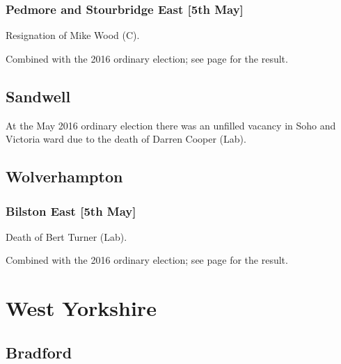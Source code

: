 \documentclass[a4paper,openany]{book}
\begin{document}
\begin{resultsiii}
\subsubsection*{Pedmore and Stourbridge East \hspace*{\fill}\nolinebreak[1]%
\enspace\hspace*{\fill}
[5th May]}


Resignation of Mike Wood (C).

Combined with the 2016 ordinary election; see page \pageref{PedmoreStourbridgeEastDudley} for the result.

\subsection*{Sandwell}

At the May 2016 ordinary election there was an unfilled vacancy in Soho and Victoria ward due to the death of Darren Cooper (Lab).

\subsection*{Wolverhampton}

\subsubsection*{Bilston East \hspace*{\fill}\nolinebreak[1]%
\enspace\hspace*{\fill}
[5th May]}


Death of Bert Turner (Lab).

Combined with the 2016 ordinary election; see page \pageref{BilstonEastWolverhampton} for the result.

\section{West Yorkshire}

\subsection*{Bradford}


\end{resultsiii}
\end{document}

